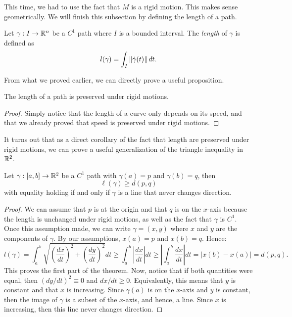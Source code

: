 This time, we had to use the fact that $M$ is a rigid motion. This makes sense geometrically. We will finish this subsection by defining the length of a path.

\begin{definition}
    Let $\gamma : I \to \mathbb{R}^n$ be a $C^1$ path where $I$ is a bounded interval. The \textit{length} of $\gamma$ is defined as
    $$l(\gamma) = \int_I\left\lVert\dot{\gamma}(t) \right\rVert dt.$$
\end{definition}

From what we proved earlier, we can directly prove a useful proposition.

\begin{proposition}
    The length of a path is preserved under rigid motions.
\end{proposition}

\begin{proof}
    Simply notice that the length of a curve only depends on its speed, and that we already proved that speed is preserved under rigid motions.
\end{proof}

It turns out that as a direct corollary of the fact that length are preserved under rigid motions, we can prove a useful generalization of the triangle inequality in $\mathbb{R}^2$.

\begin{corollary}
    Let $\gamma : [a,b] \to \mathbb{R}^2$ be a $C^1$ path with $\gamma(a) = p$ and $\gamma(b) = q$, then
    $$\ell(\gamma) \geq d(p,q)$$
    with equality holding if and only if $\gamma$ is a line that never changes direction.
\end{corollary}

\begin{proof}
    We can assume that $p$ is at the origin and that $q$ is on the $x$-axis because the length is unchanged under rigid motions, as well as the fact that $\gamma$ is $C^1$. Once this assumption made, we can write $\gamma = (x,y)$ where $x$ and $y$ are the components of $\gamma$. By our assumptions, $x(a) = p$ and $x(b) = q$. Hence:
    $$l(\gamma) = \int_{a}^{b}\sqrt{\left(\frac{dx}{dt}\right)^2 + \left(\frac{dy}{dt}\right)^2} dt \geq \int_{a}^{b}\left|\frac{dx}{dt}\right|dt \geq \left|\int_{a}^{b}\frac{dx}{dt}\right|dt = |x(b) - x(a)| = d(p,q).$$
    This proves the first part of the theorem. Now, notice that if both quantities were equal, then $(dy/dt)^2 \equiv 0$ and $dx/dt \geq 0$. Equivalently, this means that $y$ is constant and that $x$ is increasing. Since $\gamma(a)$ is on the $x$-axis and $y$ is constant, then the image of $\gamma$ is a subset of the $x$-axis, and hence, a line. Since $x$ is increasing, then this line never changes direction.
\end{proof}